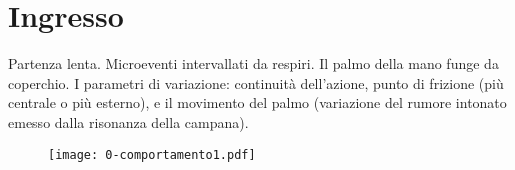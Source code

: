 \documentclass{book}
\begin{document}
\def\circleRadius{11cm}  %
\def\numCards{11}  %
\def\angleOffset{30}  %
\def\pointWidth{3pt}
\def\minimumSize{1.5pt}
\def\arrowWidth{6pt}
\def\arrowLength{9pt}
\def\sumWidth{1pt}
\def\lineWidthMore{3pt}
\def\lineWidthMedium{\lineWidthMore-1.5}
\def\lineWidth{\lineWidthMore-2.5pt}
\def\arrowWidthMore{9pt}
\def\arrowLengthMore{12pt}
\def\sumWidthMore{3pt}
\def\roundedCorners{8pt}
\def\cardRadius{2.1cm} 
\def\cardRadiusTwo{\cardRadius + .5cm} 
\def\battenteheight{.25}
\def\battentewidth{1.3}



\section*{\centering Ingresso}
\begin{minipage}{0.2\textwidth}
\end{minipage}%
\begin{minipage}{0.6\textwidth}
\justify  Partenza lenta. Microeventi intervallati da respiri. Il palmo della mano funge da coperchio. I parametri di variazione: continuità dell'azione, punto di frizione (più centrale o più esterno), e il movimento del palmo (variazione del rumore intonato emesso dalla risonanza della campana).
\end{minipage}
\begin{figure}[h!]
    \begin{flushleft}
    \texttt{[image: 0-comportamento1.pdf]}    \end{flushleft}
\end{figure}
\end{document}
